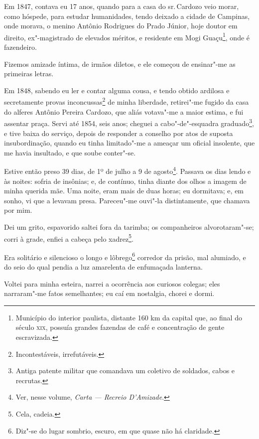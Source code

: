 Em 1847, contava eu 17 anos, quando para a casa do sr.\,Cardozo veio
morar, como hóspede, para estudar humanidades, tendo deixado a cidade de
Campinas, onde morava, o menino Antônio Rodrigues do Prado Júnior, hoje
doutor em direito, ex"-magistrado de elevados méritos, e residente em
Mogi Guaçu\footnote{Município do interior paulista, distante 160 km da
  capital que, ao final do século \textsc{xix}, possuía grandes fazendas de café
  e concentração de gente escravizada.}, onde é fazendeiro.

Fizemos amizade íntima, de irmãos diletos, e ele começou de ensinar"-me
as primeiras letras.

Em 1848, sabendo eu ler e contar alguma cousa, e tendo obtido ardilosa e
secretamente provas inconcussas\footnote{Incontestáveis, irrefutáveis.}
de minha liberdade, retirei"-me fugido da casa do alferes Antônio Pereira
Cardozo, que aliás votava"-me a maior estima, e fui assentar praça. Servi
até 1854, seis anos; cheguei a cabo"-de"-esquadra graduado\footnote{
  Antiga patente militar que comandava um coletivo de soldados, cabos e
  recrutas.}, e tive baixa do serviço, depois de responder a conselho
por atos de suposta insubordinação, quando eu tinha limitado"-me a
ameaçar um oficial insolente, que me havia insultado, e que soube
conter"-se.

Estive então preso 39 dias, de 1º de julho a 9 de agosto\footnote{Ver,
  nesse volume, \emph{Carta --- Recreio D'Amizade}.}. Passava os dias lendo
e às noites: sofria de insônias; e, de contínuo, tinha diante dos olhos
a imagem de minha querida mãe. Uma noite, eram mais de duas horas; eu
dormitava; e, em sonho, vi que a levavam presa. Pareceu"-me ouvi"-la
distintamente, que chamava por mim.

Dei um grito, espavorido saltei fora da tarimba; os companheiros
alvorotaram"-se; corri à grade, enfiei a cabeça pelo xadrez\footnote{
  Cela, cadeia.}.

Era solitário e silencioso o longo e lôbrego\footnote{Diz"-se do lugar
  sombrio, escuro, em que quase não há claridade.} corredor da prisão,
mal alumiado, e do seio do qual pendia a luz amarelenta de enfumaçada
lanterna.

Voltei para minha esteira, narrei a ocorrência aos curiosos colegas;
eles narraram"-me fatos semelhantes; eu caí em nostalgia, chorei e dormi.

